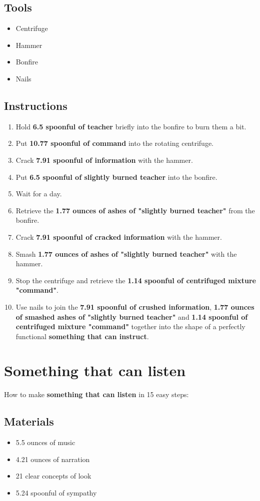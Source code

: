 \documentclass{article}
\begin{document}
\subsection{Tools}\begin{itemize}
\item 
Centrifuge
\item 
Hammer
\item 
Bonfire
\item 
Nails
\end{itemize}
\subsection{Instructions}\begin{enumerate}
\item 
Hold \textbf{6.5 spoonful of teacher} briefly into the bonfire to burn them a bit.
\item 
Put \textbf{10.77 spoonful of command} into the rotating centrifuge.
\item 
Crack \textbf{7.91 spoonful of information} with the hammer.
\item 
Put \textbf{6.5 spoonful of slightly burned teacher} into the bonfire.
\item 
Wait for a day.
\item 
Retrieve the \textbf{1.77 ounces of ashes of "slightly burned teacher"} from the bonfire.
\item 
Crack \textbf{7.91 spoonful of cracked information} with the hammer.
\item 
Smash \textbf{1.77 ounces of ashes of "slightly burned teacher"} with the hammer.
\item 
Stop the centrifuge and retrieve the \textbf{1.14 spoonful of centrifuged mixture "command"}.
\item 
Use nails to join the \textbf{7.91 spoonful of crushed information}, \textbf{1.77 ounces of smashed ashes of "slightly burned teacher"} and \textbf{1.14 spoonful of centrifuged mixture "command"} together into the shape of a perfectly functional \textbf{something that can instruct}.
\end{enumerate}
\newpage
\section{Something that can listen}How to make \textbf{something that can listen} in 15 easy steps:

\subsection{Materials}\begin{itemize}
\item 
5.5 ounces of music
\item 
4.21 ounces of narration
\item 
21 clear concepts of look
\item 
5.24 spoonful of sympathy
\end{itemize}
\end{document}
